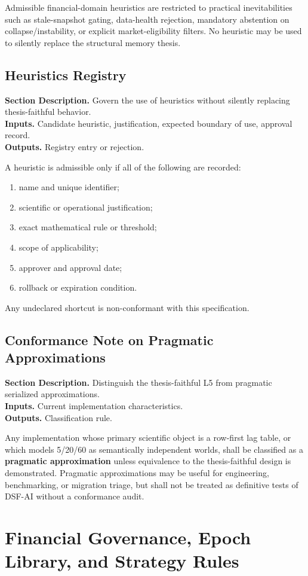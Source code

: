 \documentclass[11pt]{report}
\newcommand{\meta}[3]{\textbf{Section Description.} #1\\
\textbf{Inputs.} #2\\
\textbf{Outputs.} #3\par}
\begin{document}
Admissible financial-domain heuristics are restricted to practical inevitabilities such as stale-snapshot gating, data-health rejection, mandatory abstention on collapse/instability, or explicit market-eligibility filters. No heuristic may be used to silently replace the structural memory thesis.

\section{Heuristics Registry}
\meta{Govern the use of heuristics without silently replacing thesis-faithful behavior.}{Candidate heuristic, justification, expected boundary of use, approval record.}{Registry entry or rejection.}

A heuristic is admissible only if all of the following are recorded:
\begin{enumerate}[leftmargin=1.2cm]
    \item name and unique identifier;
    \item scientific or operational justification;
    \item exact mathematical rule or threshold;
    \item scope of applicability;
    \item approver and approval date;
    \item rollback or expiration condition.
\end{enumerate}
Any undeclared shortcut is non-conformant with this specification.

\section{Conformance Note on Pragmatic Approximations}
\meta{Distinguish the thesis-faithful L5 from pragmatic serialized approximations.}{Current implementation characteristics.}{Classification rule.}

Any implementation whose primary scientific object is a row-first lag table, or which models 5/20/60 as semantically independent worlds, shall be classified as a \textbf{pragmatic approximation} unless equivalence to the thesis-faithful design is demonstrated. Pragmatic approximations may be useful for engineering, benchmarking, or migration triage, but shall not be treated as definitive tests of DSF-AI without a conformance audit.


\chapter{Financial Governance, Epoch Library, and Strategy Rules}
\end{document}
